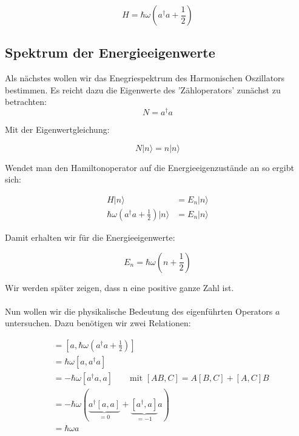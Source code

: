 \begin{equation}
  \label{eq:11}
  \boxed{ H = \hbar\omega\left(a^\dagger a + \frac{1}{2}\right) }
\end{equation}

\subsection{Spektrum der Energieeigenwerte}

Als nächstes wollen wir das Enegriespektrum des Harmonischen Oszillators bestimmen. Es reicht dazu die Eigenwerte des 'Zähloperators' zunächst zu betrachten:
\begin{equation}
  \label{eq:12}
  N = a^\dagger a
\end{equation}

Mit der Eigenwertgleichung:

\begin{equation}
  \label{eq:13}
  N|n\rangle  = n|n\rangle 
\end{equation}

Wendet man den Hamiltonoperator auf die Energieeigenzustände an so ergibt sich:

\begin{align}
  \label{eq:14}
  H|n\rangle &=E_n|n\rangle\\
 \hbar\omega\left(a^\dagger a + \frac{1}{2}\right)|n\rangle &= E_n|n\rangle 
\end{align}

Damit erhalten wir für die Energieeigenwerte:

\begin{equation}
  \label{eq:15}
  \boxed{E_n = \hbar\omega\left(n + \frac{1}{2}\right) }
\end{equation}

Wir werden später zeigen, dass n eine positive ganze Zahl ist.\\
\\
Nun wollen wir die physikalische Bedeutung des eigenführten Operators \(a\) untersuchen. Dazu benötigen wir zwei Relationen:

\begin{align}
  [a,H] &= [a,\hbar\omega(a^\dagger a +\frac{1}{2})]  \\
&= \hbar\omega[a,a^\dagger a ]  \\
&=-\hbar\omega[a^\dagger a,a] \qquad \text{mit }[AB,C]=A[B,C]+[A,C]B \\
&=-\hbar\omega(\underbrace{a^\dagger[a,a]}_{=0}+\underbrace{[a^\dagger,a]}_{=-1}a)\\
&=\hbar\omega a \label{eq:16}
\end{align}

